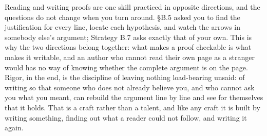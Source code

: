 \documentclass[a4paper,12pt,oneside]{memoir}
\begin{document}
Reading and writing proofs are one skill practiced in opposite directions, and the questions do not change when you turn around. §B.5 asked you to find the justification for every line, locate each hypothesis, and watch the arrows in somebody else’s argument; Strategy B.7 asks exactly that of your own. This is why the two directions belong together: what makes a proof checkable is what makes it writable, and an author who cannot read their own page as a stranger would has no way of knowing whether the complete argument is on the page. Rigor, in the end, is the discipline of leaving nothing load-bearing unsaid: of writing so that someone who does not already believe you, and who cannot ask you what you meant, can rebuild the argument line by line and see for themselves that it holds. That is a craft rather than a talent, and like any craft it is built by writing something, finding out what a reader could not follow, and writing it again.
\end{document}
